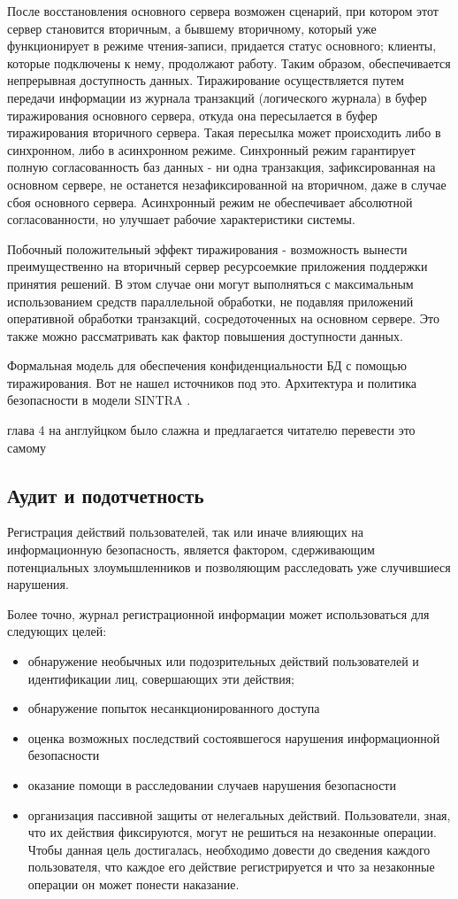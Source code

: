 После восстановления основного сервера возможен сценарий, при котором этот сервер становится
вторичным, а бывшему вторичному, который уже функционирует в режиме чтения-записи, придается
статус основного; клиенты, которые подключены к нему, продолжают работу. Таким образом,
обеспечивается непрерывная доступность данных.
Тиражирование осуществляется путем передачи информации из журнала транзакций (логического журнала)
в буфер тиражирования основного сервера, откуда она пересылается в буфер тиражирования вторичного
сервера. Такая пересылка может происходить либо в синхронном, либо в асинхронном режиме. Синхронный
режим гарантирует полную согласованность баз данных - ни одна транзакция, зафиксированная на
основном сервере, не останется незафиксированной на вторичном, даже в случае сбоя основного
сервера. Асинхронный режим не обеспечивает абсолютной согласованности, но улучшает рабочие
характеристики системы.

Побочный положительный эффект тиражирования - возможность вынести преимущественно на вторичный
сервер ресурсоемкие приложения поддержки принятия решений. В этом случае они могут выполняться с
максимальным использованием средств параллельной обработки, не подавляя приложений оперативной
обработки транзакций, сосредоточенных на основном сервере. Это также можно рассматривать как фактор
повышения доступности данных.

Формальная модель для обеспечения конфиденциальности БД с помощью тиражирования.
Вот не нашел источников под это.
Архитектура и политика безопасности в модели SINTRA \cite{data-replication}.

глава 4 на англуйцком было слажна и предлагается читателю перевести это самому


\subsection{Аудит и подотчетность}
Регистрация действий пользователей, так или иначе влияющих на информационную безопасность, является
фактором, сдерживающим потенциальных злоумышленников и позволяющим расследовать уже случившиеся нарушения.

Более точно, журнал регистрационной информации может использоваться для следующих целей:
\begin{itemize}
    \item обнаружение необычных или подозрительных действий пользователей и идентификации лиц,
        совершающих эти действия;
    \item обнаружение попыток несанкционированного доступа
    \item оценка возможных последствий состоявшегося нарушения информационной безопасности
    \item оказание помощи в расследовании случаев нарушения безопасности
    \item организация пассивной защиты от нелегальных действий. Пользователи, зная, что их действия
        фиксируются, могут не решиться на незаконные операции. Чтобы данная цель достигалась,
        необходимо довести до сведения каждого пользователя, что каждое его действие регистрируется
        и что за незаконные операции он может понести наказание.
\end{itemize}


